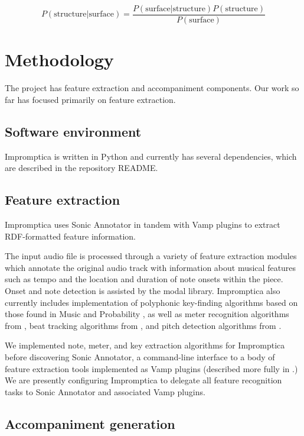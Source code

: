 \documentclass[11pt,conference,letterpaper]{IEEEtran}
\begin{document}
{\small
  \[ P(\text{structure}|\text{surface}) = \frac{P(\text{surface}|\text{structure})P(\text{structure})}{P(\text{surface})} \]
}


\section{Methodology}

The project has feature extraction and accompaniment components. Our work so far has focused primarily on feature extraction.

\subsection{Software environment}

Impromptica is written in Python and currently has several dependencies, which are described in the repository README.

\subsection{Feature extraction}

Impromptica uses Sonic Annotator in tandem with Vamp plugins to extract RDF-formatted feature information.

The input audio file is processed through a variety of feature extraction modules which annotate the original audio track with information about musical features such as tempo and the location and duration of note onsets within the piece. Onset and note detection is assisted by the modal library. Impromptica also currently includes implementation of polyphonic key-finding algorithms based on those found in Music and Probability \cite{temperly2007mprob}, as well as meter recognition algorithms from \cite{klapuri2006analysis}, beat tracking algorithms from \cite{ellis2007beat}, and pitch detection algorithms from \cite{klapuri2003multiple}.

We implemented note, meter, and key extraction algorithms for Impromptica before discovering Sonic Annotator, a command-line interface to a body of feature extraction tools implemented as Vamp plugins (described more fully in \cite{cannam2010sonic}.) We are presently configuring Impromptica to delegate all feature recognition tasks to Sonic Annotator and associated Vamp plugins.

\subsection{Accompaniment generation}
\end{document}
